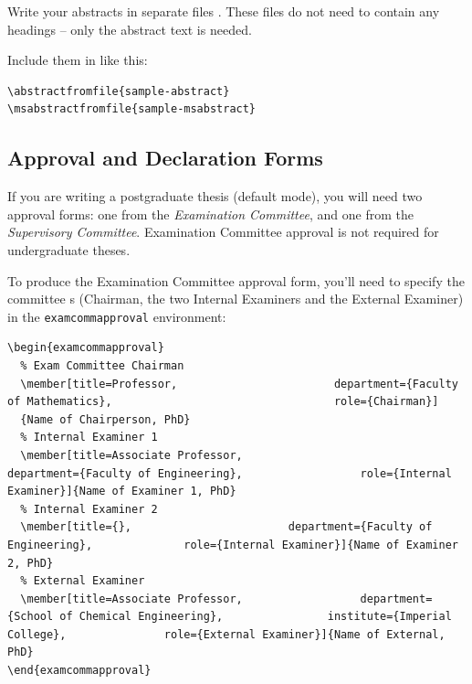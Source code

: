 \documentclass[a4paper,nofonts,raggedright,titlepage,openany]{tufte-book}
\begin{document}
Write your abstracts in separate files . These files do not need to contain any headings -- only the abstract text is needed.

Include them in  like this:

\begin{verbatim}
\abstractfromfile{sample-abstract}
\msabstractfromfile{sample-msabstract}
\end{verbatim}



\subsection{Approval and Declaration Forms}
\label{sec:approval}

If you are writing a postgraduate thesis (default mode), you will need two approval forms: one from the \emph{Examination Committee}, and one from the \emph{Supervisory Committee}. Examination Committee approval is  not required for undergraduate theses.

To produce the Examination Committee approval form, you'll need to specify the committee \texttt{\member}s (Chairman, the two Internal Examiners and the External Examiner) in the \texttt{examcommapproval} environment: 



\begin{verbatim}
\begin{examcommapproval}
  % Exam Committee Chairman
  \member[title=Professor,                        department={Faculty of Mathematics},                                  role={Chairman}]
  {Name of Chairperson, PhD}
  % Internal Examiner 1
  \member[title=Associate Professor,                         department={Faculty of Engineering},                  role={Internal Examiner}]{Name of Examiner 1, PhD}
  % Internal Examiner 2
  \member[title={},                        department={Faculty of Engineering},              role={Internal Examiner}]{Name of Examiner 2, PhD}
  % External Examiner
  \member[title=Associate Professor,                  department={School of Chemical Engineering},                institute={Imperial College},               role={External Examiner}]{Name of External, PhD}
\end{examcommapproval}
\end{verbatim}
\end{document}
